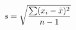 \documentclass[preview]{standalone}
\begin{document}
\begin{align*}
\special{dvisvgm:raw <g id='unique000'>}s = \sqrt{\frac{\sum (x_i - \bar{x})^2}{n - 1}}\special{dvisvgm:raw </g>}
\end{align*}
\end{document}
